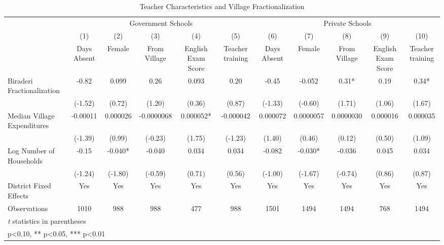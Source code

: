 \begin{sidewaystable}[htbp]\centering
\def\sym#1{\ifmmode^{#1}\else\(^{#1}\)\fi}
\caption{Teacher Characteristics and Village Fractionalization\label{teachers}}
\begin{tabular}{l*{10}{c}}
\toprule
                &\multicolumn{5}{c}{Government Schools}                          &\multicolumn{5}{c}{Private Schools}                             \\\cmidrule(lr){2-6}\cmidrule(lr){7-11}
                &\multicolumn{1}{c}{(1)}&\multicolumn{1}{c}{(2)}&\multicolumn{1}{c}{(3)}&\multicolumn{1}{c}{(4)}&\multicolumn{1}{c}{(5)}&\multicolumn{1}{c}{(6)}&\multicolumn{1}{c}{(7)}&\multicolumn{1}{c}{(8)}&\multicolumn{1}{c}{(9)}&\multicolumn{1}{c}{(10)}\\
                &\multicolumn{1}{c}{Days Absent}&\multicolumn{1}{c}{Female}&\multicolumn{1}{c}{From Village}&\multicolumn{1}{c}{English Exam Score}&\multicolumn{1}{c}{Teacher training}&\multicolumn{1}{c}{Days Absent}&\multicolumn{1}{c}{Female}&\multicolumn{1}{c}{From Village}&\multicolumn{1}{c}{English Exam Score}&\multicolumn{1}{c}{Teacher training}\\
\midrule
Biraderi Fractionalization&    -0.82   &    0.099   &     0.26   &    0.093   &     0.20   &    -0.45   &   -0.052   &     0.31*  &     0.19   &     0.34*  \\
                &  (-1.52)   &   (0.72)   &   (1.20)   &   (0.36)   &   (0.87)   &  (-1.33)   &  (-0.60)   &   (1.71)   &   (1.06)   &   (1.67)   \\
Median Village Expenditures& -0.00011   & 0.000026   &-0.0000068   & 0.000052*  &-0.000042   & 0.000072   &0.0000057   &0.0000030   & 0.000016   & 0.000035   \\
                &  (-1.39)   &   (0.99)   &  (-0.23)   &   (1.75)   &  (-1.23)   &   (1.40)   &   (0.46)   &   (0.12)   &   (0.50)   &   (1.09)   \\
Log Number of Households&    -0.15   &   -0.040*  &   -0.040   &    0.034   &    0.034   &   -0.082   &   -0.030*  &   -0.036   &    0.045   &    0.034   \\
                &  (-1.24)   &  (-1.80)   &  (-0.59)   &   (0.71)   &   (0.56)   &  (-1.00)   &  (-1.67)   &  (-0.74)   &   (0.86)   &   (0.87)   \\
District Fixed Effects&      Yes   &      Yes   &      Yes   &      Yes   &      Yes   &      Yes   &      Yes   &      Yes   &      Yes   &      Yes   \\
\midrule
Observations    &     1010   &      988   &      988   &      477   &      988   &     1501   &     1494   &     1494   &      768   &     1494   \\
\bottomrule
\multicolumn{11}{l}{\footnotesize \textit{t} statistics in parentheses}\\
\multicolumn{11}{l}{\footnotesize * p<0.10, ** p<0.05, *** p<0.01}\\
\end{tabular}
\end{sidewaystable}
